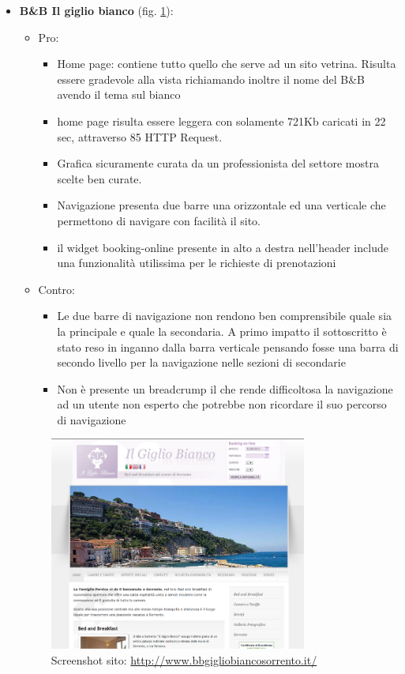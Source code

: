 \documentclass[a4paper,12pt,hidelinks]{report}
\begin{document}
\begin{itemize}
\begin{itemize}
\begin{figure}[h!]
	  \end{figure}
      \item \textbf{B\&B Il giglio bianco} (fig. \ref{fig:bebGiglio}):
	\begin{itemize}
	 \item Pro:
	  \begin{itemize}
	   \item Home page: contiene tutto quello che serve ad un sito vetrina. Risulta essere gradevole alla vista richiamando inoltre il nome del B\&B avendo il 
	   tema sul bianco
	   \item home page risulta essere leggera con solamente 721Kb caricati in 22 sec, attraverso 85 HTTP Request.
	   \item Grafica sicuramente curata da un professionista del settore mostra scelte ben curate.
	   \item Navigazione presenta due barre una orizzontale ed una verticale che permettono di navigare con facilità il sito.
	   \item il widget booking-online presente in alto a destra nell'header include una funzionalità utilissima per le richieste di prenotazioni
	  \end{itemize}
	 \item Contro:
	  \begin{itemize}
	   \item Le due barre di navigazione non rendono ben comprensibile quale sia la principale e quale la secondaria. A primo impatto il sottoscritto è stato reso in inganno
	   dalla barra verticale pensando fosse una barra di secondo livello per la navigazione nelle sezioni di secondarie
	   \item Non è presente un breadcrump il che rende difficoltosa la navigazione ad un utente non esperto che potrebbe non ricordare il suo percorso di navigazione
	  \end{itemize}
	\end{itemize}
	\begin{figure}[h!]%
	    \includegraphics[width=0.80\textwidth,keepaspectratio=true]{img/bebGiglio}
	    \centering
	    \caption{Screenshot sito: \url{http://www.bbgigliobiancosorrento.it/}}%
	    \label{fig:bebGiglio}%
	  \end{figure}
    \end{itemize}
  \end{itemize}
\end{document}
